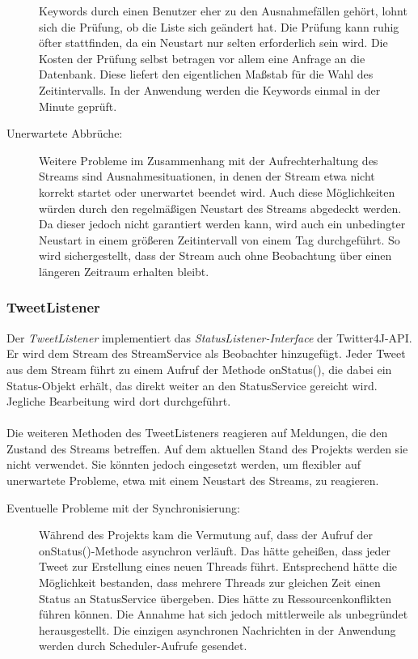 \begin{description}
		Keywords durch einen Benutzer eher zu den Ausnahmefällen gehört, lohnt sich die Prüfung, ob
		die Liste sich geändert hat. Die Prüfung kann ruhig öfter stattfinden, da ein Neustart nur 
		selten erforderlich sein wird. Die Kosten der Prüfung selbst betragen vor allem eine Anfrage 
		an die Datenbank. Diese liefert den eigentlichen Maßstab für die Wahl des Zeitintervalls. In 
		der Anwendung werden die Keywords einmal in der Minute geprüft.
	\item [Unerwartete Abbrüche:] Weitere Probleme im Zusammenhang mit der Aufrechterhaltung des Streams sind Ausnahmesituationen, in denen der Stream etwa nicht korrekt startet oder unerwartet beendet wird. Auch diese Möglichkeiten würden durch den regelmäßigen Neustart des Streams abgedeckt werden. Da dieser jedoch nicht garantiert werden kann, wird auch ein unbedingter Neustart in einem größeren Zeitintervall von einem Tag durchgeführt. So wird sichergestellt, dass der Stream auch ohne Beobachtung über einen längeren Zeitraum erhalten bleibt.
\end{description}
\subsubsection*{TweetListener}
Der \textit{TweetListener} implementiert das \textit{StatusListener-Interface} der Twitter4J-API. Er 
wird dem Stream des StreamService als Beobachter hinzugefügt. Jeder Tweet aus dem Stream führt zu 
einem Aufruf der Methode onStatus(), die dabei ein Status-Objekt erhält, das direkt weiter an den 
StatusService gereicht wird. Jegliche Bearbeitung wird dort durchgeführt. \\\\
Die weiteren Methoden des TweetListeners reagieren auf Meldungen, die den Zustand des Streams 
betreffen. Auf dem aktuellen Stand des Projekts werden sie nicht verwendet. Sie könnten jedoch 
eingesetzt werden, um flexibler auf unerwartete Probleme, etwa mit einem Neustart des Streams,  zu 
reagieren. \newpage 
\begin{description}
	\item [Eventuelle Probleme mit der Synchronisierung:] Während des Projekts kam die Vermutung auf, dass der Aufruf der onStatus()-Methode asynchron verläuft. Das hätte geheißen, dass jeder Tweet zur Erstellung eines neuen Threads führt. Entsprechend hätte die Möglichkeit bestanden, dass mehrere Threads zur gleichen Zeit einen Status an StatusService übergeben. Dies hätte zu Ressourcenkonflikten führen können. Die Annahme hat sich jedoch mittlerweile als unbegründet herausgestellt. Die einzigen asynchronen Nachrichten in der Anwendung werden durch Scheduler-Aufrufe gesendet.
\end{description}
